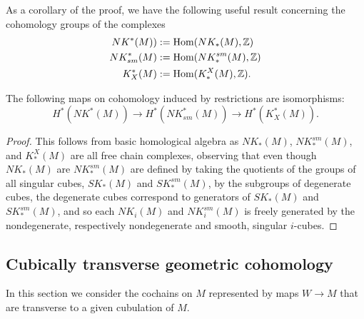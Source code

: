 As a corollary of the proof, we have the following useful result concerning the cohomology groups of the complexes
\begin{align*}
NK^*(M))&:=\textup{Hom}(NK_*(M),\mathbb{Z})\\
NK_{sm}^*(M)&:=\textup{Hom}(NK^{sm}_*(M),\mathbb{Z})\\
K^*_X(M)&:=\textup{Hom}(K^X_*(M),\mathbb{Z}). 
\end{align*}



\begin{corollary}
The following maps on cohomology induced by restrictions  are isomorphisms: $$H^*(NK^*(M))\to H^*(NK_{sm}^*(M))\to H^*(K^*_X(M)).$$
\end{corollary}
\begin{proof}
This follows from basic homological algebra \cite[Theorem 45.5]{Mun84} as $NK_*(M)$, $NK^{sm}_*(M)$, and $K^X_*(M)$ are all free chain complexes, observing that even though $NK_*(M)$ are $NK^{sm}_*(M)$ are defined by taking the quotients of the groups of all singular cubes, $SK_*(M)$ and $SK^{sm}_*(M)$, by the subgroups of degenerate cubes, the degenerate cubes correspond to generators of $SK_*(M)$ and $SK^{sm}_*(M)$, and so each $NK_i(M)$ and $NK^{sm}_i(M)$ is freely generated by the nondegenerate, respectively nondegenerate and smooth, singular $i$-cubes. 
\end{proof}



\subsection{Cubically transverse geometric cohomology}\label{S: transverse cochains}


In this section we consider the cochains on $M$ represented by maps $W\to M$ that are transverse to a given cubulation of $M$.


